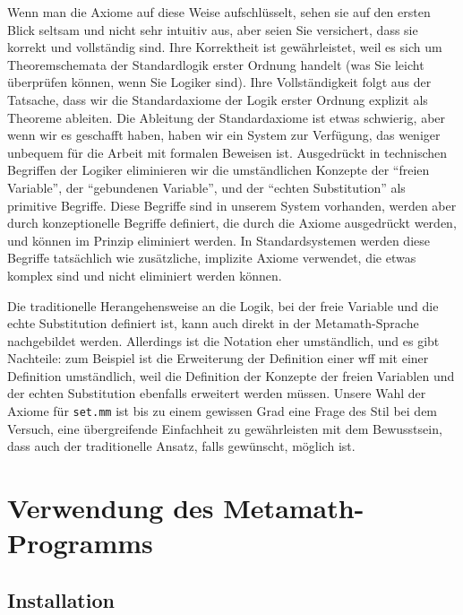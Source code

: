 Wenn man die Axiome auf diese Weise aufschlüsselt, sehen sie auf den ersten Blick seltsam und nicht sehr intuitiv aus, aber seien Sie versichert, dass sie korrekt und vollständig sind.  Ihre Korrektheit ist gewährleistet, weil es sich um Theoremschemata der Standardlogik erster Ordnung handelt (was Sie leicht überprüfen können, wenn Sie Logiker sind).  Ihre Vollständigkeit folgt aus der Tatsache, dass wir die Standardaxiome der Logik erster Ordnung explizit als Theoreme ableiten.  Die Ableitung der Standardaxiome ist etwas schwierig, aber wenn wir es geschafft haben, haben wir ein System zur Verfügung, das weniger unbequem für die Arbeit mit formalen Beweisen ist.
Ausgedrückt in technischen Begriffen der Logiker eliminieren wir die umständlichen Konzepte der "`freien Variable"', der "`gebundenen Variable"', und der "`echten Substitution"' als primitive Begriffe.  Diese Begriffe sind in unserem System vorhanden, werden aber durch konzeptionelle Begriffe definiert, die durch die Axiome ausgedrückt werden, und können im Prinzip eliminiert werden.  In Standardsystemen werden diese Begriffe tatsächlich wie zusätzliche, implizite Axiome verwendet, die etwas komplex sind und nicht eliminiert werden können.

Die traditionelle Herangehensweise an die Logik, bei der freie Variable und die echte Substitution definiert ist, kann auch direkt in der Metamath-Sprache nachgebildet werden.
Allerdings ist die Notation eher umständlich, und es gibt Nachteile: zum Beispiel ist die Erweiterung der Definition einer wff mit einer Definition umständlich, weil die Definition der Konzepte der freien Variablen und der echten Substitution ebenfalls erweitert werden müssen.  Unsere Wahl der Axiome für \texttt{set.mm} ist bis zu einem gewissen Grad eine Frage des Stil bei dem Versuch, eine übergreifende Einfachheit zu gewährleisten mit dem Bewusstsein, dass auch der traditionelle Ansatz, falls gewünscht, möglich ist.

\chapter{Verwendung des Metamath-Programms}
\label{using}

\section{Installation}

